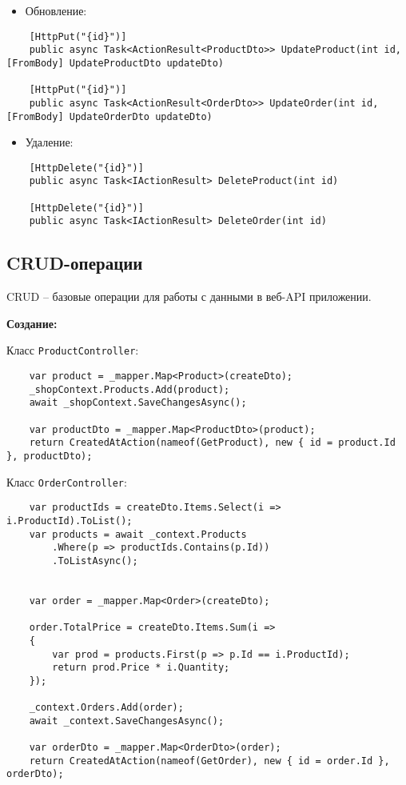 \documentclass[a4paper,12pt]{report}
\begin{document}
\begin{itemize}
    \item Обновление:
\end{itemize}

\begin{verbatim}
    [HttpPut("{id}")]
    public async Task<ActionResult<ProductDto>> UpdateProduct(int id, [FromBody] UpdateProductDto updateDto)
    
    [HttpPut("{id}")]
    public async Task<ActionResult<OrderDto>> UpdateOrder(int id, [FromBody] UpdateOrderDto updateDto)
\end{verbatim}

\begin{itemize}
    \item Удаление:
\end{itemize}
    
\begin{verbatim}
    [HttpDelete("{id}")]
    public async Task<IActionResult> DeleteProduct(int id)

    [HttpDelete("{id}")]
    public async Task<IActionResult> DeleteOrder(int id)
\end{verbatim}

\subsection{\acs{CRUD}-операции}

\acs{CRUD} -- базовые операции для работы с данными в веб-\acs{API} приложении.

\textbf{Создание:}

Класс \texttt{ProductController}:
\begin{verbatim}
    var product = _mapper.Map<Product>(createDto);
    _shopContext.Products.Add(product);
    await _shopContext.SaveChangesAsync();

    var productDto = _mapper.Map<ProductDto>(product);
    return CreatedAtAction(nameof(GetProduct), new { id = product.Id }, productDto);
\end{verbatim}

Класс \texttt{OrderController}:
\begin{verbatim}
    var productIds = createDto.Items.Select(i => i.ProductId).ToList();
    var products = await _context.Products
        .Where(p => productIds.Contains(p.Id))
        .ToListAsync();

        
    var order = _mapper.Map<Order>(createDto);

    order.TotalPrice = createDto.Items.Sum(i =>
    {
        var prod = products.First(p => p.Id == i.ProductId);
        return prod.Price * i.Quantity;
    });

    _context.Orders.Add(order);
    await _context.SaveChangesAsync();

    var orderDto = _mapper.Map<OrderDto>(order);
    return CreatedAtAction(nameof(GetOrder), new { id = order.Id }, orderDto);
\end{verbatim}
\end{document}
